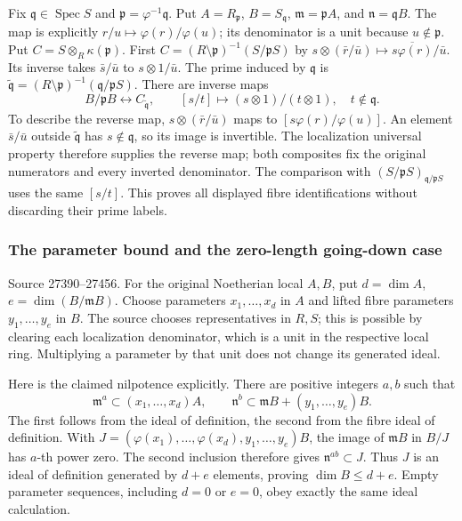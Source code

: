 Fix \(\mathfrak q\in\operatorname{Spec}S\) and \(\mathfrak p=\varphi^{-1}\mathfrak q\). Put \(A=R_{\mathfrak p}\), \(B=S_{\mathfrak q}\), \(\mathfrak m=\mathfrak pA\), and \(\mathfrak n=\mathfrak qB\). The map is explicitly \(r/u\mapsto\varphi(r)/\varphi(u)\); its denominator is a unit because \(u\notin\mathfrak p\). Put \(C=S\otimes_R\kappa(\mathfrak p)\). First \(C=(R\setminus\mathfrak p)^{-1}(S/\mathfrak pS)\) by \(s\otimes(\bar r/\bar u)\mapsto\overline{s\varphi(r)}/\bar u\). Its inverse takes \(\bar s/\bar u\) to \(s\otimes1/\bar u\). The prime induced by \(\mathfrak q\) is \(\tilde{\mathfrak q}=(R\setminus\mathfrak p)^{-1}
(\mathfrak q/\mathfrak pS)\). There are inverse maps \[
 B/\mathfrak pB\longleftrightarrow C_{\tilde{\mathfrak q}},
 \qquad
 [s/t]\longmapsto(s\otimes1)/(t\otimes1),\quad t\notin\mathfrak q.
\] To describe the reverse map, \(s\otimes(\bar r/\bar u)\) maps to \([s\varphi(r)/\varphi(u)]\). An element \(\bar s/\bar u\) outside \(\tilde{\mathfrak q}\) has \(s\notin\mathfrak q\), so its image is invertible. The localization universal property therefore supplies the reverse map; both composites fix the original numerators and every inverted denominator. The comparison with \((S/\mathfrak pS)_{\mathfrak q/\mathfrak pS}\) uses the same \([s/t]\). This proves all displayed fibre identifications without discarding their prime labels.

\subsubsection{The parameter bound and the zero-length going-down case}\label{the-parameter-bound-and-the-zero-length-going-down-case}

Source 27390--27456. For the original Noetherian local \(A,B\), put \(d=\dim A\), \(e=\dim(B/\mathfrak mB)\). Choose parameters \(x_1,\ldots,x_d\) in \(A\) and lifted fibre parameters \(y_1,\ldots,y_e\) in \(B\). The source chooses representatives in \(R,S\); this is possible by clearing each localization denominator, which is a unit in the respective local ring. Multiplying a parameter by that unit does not change its generated ideal.

Here is the claimed nilpotence explicitly. There are positive integers \(a,b\) such that \[
 \mathfrak m^a\subset(x_1,\ldots,x_d)A,\qquad
 \mathfrak n^b\subset\mathfrak mB+(y_1,\ldots,y_e)B.
\] The first follows from the ideal of definition, the second from the fibre ideal of definition. With \(J=(\varphi(x_1),\ldots,\varphi(x_d),
y_1,\ldots,y_e)B\), the image of \(\mathfrak mB\) in \(B/J\) has \(a\)-th power zero. The second inclusion therefore gives \(\mathfrak n^{ab}\subset J\). Thus \(J\) is an ideal of definition generated by \(d+e\) elements, proving \(\dim B\leq d+e\). Empty parameter sequences, including \(d=0\) or \(e=0\), obey exactly the same ideal calculation.

